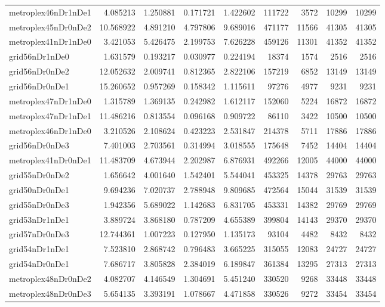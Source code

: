 \begin{longtable}{|l|r|r|r|r|r|r|r|r|}
metroplex46nDr1nDe1 & 4.085213 & 1.250881 & 0.171721 & 1.422602 & 111722 & 3572 & 10299 & 10299 \\
metroplex45nDr0nDe2 & 10.568922 & 4.891210 & 4.797806 & 9.689016 & 471177 & 11566 & 41305 & 41305 \\
metroplex41nDr1nDe0 & 3.421053 & 5.426475 & 2.199753 & 7.626228 & 459126 & 11301 & 41352 & 41352 \\
grid56nDr1nDe0 & 1.631579 & 0.193217 & 0.030977 & 0.224194 & 18374 & 1574 & 2516 & 2516 \\
grid56nDr0nDe2 & 12.052632 & 2.009741 & 0.812365 & 2.822106 & 157219 & 6852 & 13149 & 13149 \\
grid56nDr0nDe1 & 15.260652 & 0.957269 & 0.158342 & 1.115611 & 97276 & 4977 & 9231 & 9231 \\
metroplex47nDr1nDe0 & 1.315789 & 1.369135 & 0.242982 & 1.612117 & 152060 & 5224 & 16872 & 16872 \\
metroplex47nDr1nDe1 & 11.486216 & 0.813554 & 0.096168 & 0.909722 & 86110 & 3422 & 10500 & 10500 \\
metroplex46nDr1nDe0 & 3.210526 & 2.108624 & 0.423223 & 2.531847 & 214378 & 5711 & 17886 & 17886 \\
grid56nDr0nDe3 & 7.401003 & 2.703561 & 0.314994 & 3.018555 & 175648 & 7452 & 14404 & 14404 \\
metroplex41nDr0nDe1 & 11.483709 & 4.673944 & 2.202987 & 6.876931 & 492266 & 12005 & 44000 & 44000 \\
grid55nDr0nDe2 & 1.656642 & 4.001640 & 1.542401 & 5.544041 & 453325 & 14378 & 29763 & 29763 \\
grid50nDr0nDe1 & 9.694236 & 7.020737 & 2.788948 & 9.809685 & 472564 & 15044 & 31539 & 31539 \\
grid55nDr0nDe3 & 1.942356 & 5.689022 & 1.142683 & 6.831705 & 453331 & 14382 & 29769 & 29769 \\
grid53nDr1nDe1 & 3.889724 & 3.868180 & 0.787209 & 4.655389 & 399804 & 14143 & 29370 & 29370 \\
grid57nDr0nDe3 & 12.744361 & 1.007223 & 0.127950 & 1.135173 & 93104 & 4482 & 8432 & 8432 \\
grid54nDr1nDe1 & 7.523810 & 2.868742 & 0.796483 & 3.665225 & 315055 & 12083 & 24727 & 24727 \\
grid54nDr0nDe1 & 7.686717 & 3.805828 & 2.384019 & 6.189847 & 361384 & 13295 & 27313 & 27313 \\
metroplex48nDr0nDe2 & 4.082707 & 4.146549 & 1.304691 & 5.451240 & 330520 & 9268 & 33448 & 33448 \\
metroplex48nDr0nDe3 & 5.654135 & 3.393191 & 1.078667 & 4.471858 & 330526 & 9272 & 33454 & 33454 \\

\end{longtable}
